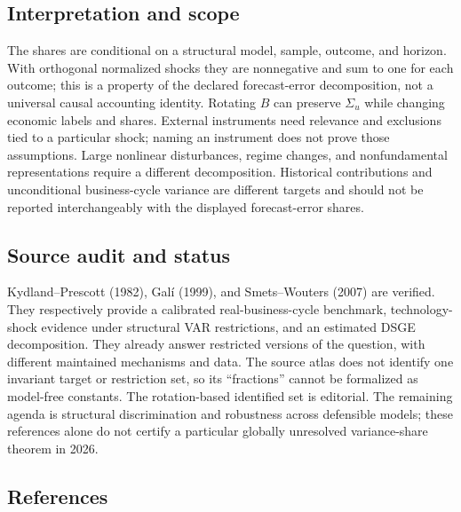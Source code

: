 \documentclass[11pt,a4paper]{article}
\begin{document}
\subsection*{Interpretation and scope}

The shares are conditional on a structural model, sample, outcome, and horizon. With orthogonal normalized shocks they are nonnegative and sum to one for each outcome; this is a property of the declared forecast-error decomposition, not a universal causal accounting identity. Rotating $B$ can preserve $\Sigma_u$ while changing economic labels and shares. External instruments need relevance and exclusions tied to a particular shock; naming an instrument does not prove those assumptions. Large nonlinear disturbances, regime changes, and nonfundamental representations require a different decomposition. Historical contributions and unconditional business-cycle variance are different targets and should not be reported interchangeably with the displayed forecast-error shares.

\subsection*{Source audit and status}

Kydland--Prescott (1982), Galí (1999), and Smets--Wouters (2007) are verified. They respectively provide a calibrated real-business-cycle benchmark, technology-shock evidence under structural VAR restrictions, and an estimated DSGE decomposition. They already answer restricted versions of the question, with different maintained mechanisms and data. The source atlas does not identify one invariant target or restriction set, so its ``fractions'' cannot be formalized as model-free constants. The rotation-based identified set is editorial. The remaining agenda is structural discrimination and robustness across defensible models; these references alone do not certify a particular globally unresolved variance-share theorem in 2026.

\subsection*{References}
\end{document}

